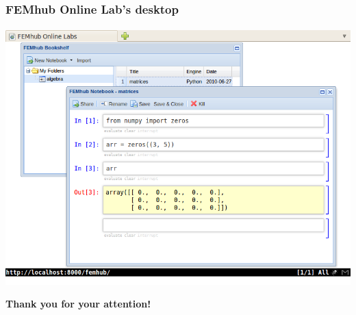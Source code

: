 \documentclass{beamer}
\begin{document}
\begin{frame}
    \frametitle{FEMhub Online Lab's desktop}
    \framesubtitle{}

    \begin{center}
        \includegraphics[scale=0.45]{images/femhub-online-lab.png}
    \end{center}
\end{frame}

%

%

\begin{frame}[plain]
    \begin{center}
        \textbf{Thank you for your attention!}
    \end{center}
\end{frame}
\end{document}
